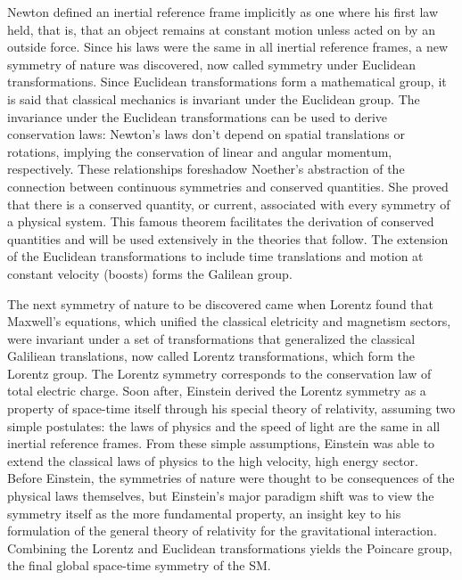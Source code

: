 \indent Newton defined an inertial reference frame implicitly as one where his first law held, that is, that an object remains at constant motion unless acted on by an outside force. Since his laws were the same in all inertial reference frames, a new symmetry of nature was discovered, now called symmetry under Euclidean transformations. Since Euclidean transformations form a mathematical group, it is said that classical mechanics is invariant under the Euclidean group. The invariance under the Euclidean transformations can be used to derive conservation laws: Newton's laws don't depend on spatial translations or rotations, implying the conservation of linear and angular momentum, respectively. These relationships foreshadow Noether's abstraction of the connection between continuous symmetries and conserved quantities. She proved that there is a conserved quantity, or current, associated with every symmetry of a physical system. This famous theorem facilitates the derivation of conserved quantities and will be used extensively in the theories that follow. The extension of the Euclidean transformations to include time translations and motion at constant velocity (boosts) forms the Galilean group.

\indent The next symmetry of nature to be discovered came when Lorentz found that Maxwell's equations, which unified the classical eletricity and magnetism sectors, were invariant under a set of transformations that generalized the classical Galiliean translations, now called Lorentz transformations, which form the Lorentz group. The Lorentz symmetry corresponds to the conservation law of total electric charge. Soon after, Einstein derived the Lorentz symmetry as a property of space-time itself through his special theory of relativity, assuming two simple postulates: the laws of physics and the speed of light are the same in all inertial reference frames. From these simple assumptions, Einstein was able to extend the classical laws of physics to the high velocity, high energy sector. Before Einstein, the symmetries of nature were thought to be consequences of the physical laws themselves, but Einstein's major paradigm shift was to view the symmetry itself as the more fundamental property, an insight key to his formulation of the general theory of relativity for the gravitational interaction. Combining the Lorentz and Euclidean transformations yields the Poincare group, the final global space-time symmetry of the SM.

